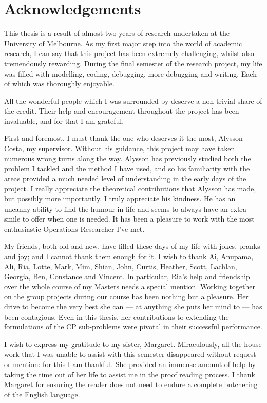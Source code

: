 \chapter{Acknowledgements}
\label{chap:ack}

This thesis is a result of almost two years 
of research undertaken at the University of Melbourne.
As my first major step into the world of academic
research, I can say that this project has been 
extremely challenging, whilst also tremendously rewarding.
During the final semester of the research project, my life
was filled with modelling, coding, debugging,
more debugging and writing.
Each of which was thoroughly enjoyable.

All the wonderful people which I was surrounded
by deserve a non-trivial share of the credit.
Their help and encouragement throughout the project has been invaluable,
and for that I am grateful.

First and foremost, I must thank the one who deserves it the most,
Alysson Costa, my supervisor.
Without his guidance, this project may have taken numerous wrong turns
along the way.
Alysson has previously studied both the problem I tackled
and the method I have used, and so his familiarity with the
areas provided a much needed level of understanding in the early days of the project.
I really appreciate the theoretical contributions that Alysson has
made, but possibly more importantly,
I truly appreciate his kindness.
He has an uncanny ability to find the humour in life
and seems to always have an extra smile to offer when one is needed.
It has been a pleasure to work with the most enthusiastic Operations
Researcher I've met.

My friends, both old and new, have filled these days 
of my life with jokes, pranks and joy; and I cannot thank them
enough for it.
I wish to thank Ai, Anupama, Ali, Ria, Lotte, Mark, Mim, 
Shian, John, Curtis, Heather, Scott, Lachlan, 
Georgia, Ben, Constance and Vincent.
In particular, Ria's help and friendship over the whole course
of my Masters needs a special mention.
Working together on the group projects during our course
has been nothing but a pleasure.
Her drive to become the very best she can --- at anything she puts her mind to ---
has been contagious.
Even in this thesis, her contributions to extending the
formulations of the CP sub-problems were pivotal in their successful performance.

I wish to express my gratitude to my sister, Margaret.
Miraculously, all the house work that I was unable to
assist with this semester disappeared without
request or mention: for this I am thankful.
She provided an immense amount of help by taking the time
out of her life to
assist me in the proof reading process.
I thank Margaret for ensuring the reader does not need
to endure a complete butchering of the English language.

